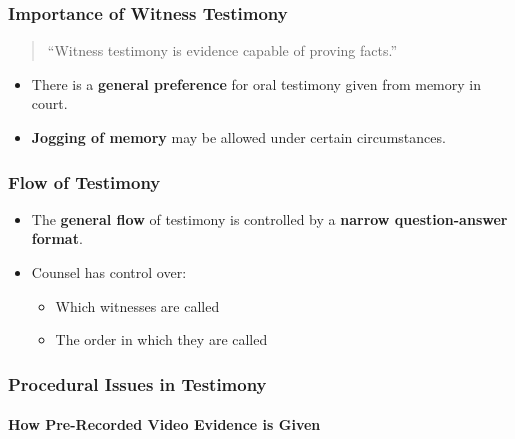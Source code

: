\subsubsection{Importance of Witness
Testimony}\label{importance-of-witness-testimony}

\begin{quote}
``Witness testimony is evidence capable of proving facts.''
\end{quote}

\begin{itemize}
\tightlist
\item
  There is a \textbf{general preference} for oral testimony given from
  memory in court.
\item
  \textbf{Jogging of memory} may be allowed under certain circumstances.
\end{itemize}

\subsubsection{Flow of Testimony}\label{flow-of-testimony}

\begin{itemize}
\tightlist
\item
  The \textbf{general flow} of testimony is controlled by a
  \textbf{narrow question-answer format}.
\item
  Counsel has control over:

  \begin{itemize}
  \tightlist
  \item
    Which witnesses are called
  \item
    The order in which they are called
  \end{itemize}
\end{itemize}

\subsubsection{Procedural Issues in
Testimony}\label{procedural-issues-in-testimony}

\paragraph{How Pre-Recorded Video Evidence is
Given}\label{how-pre-recorded-video-evidence-is-given}

